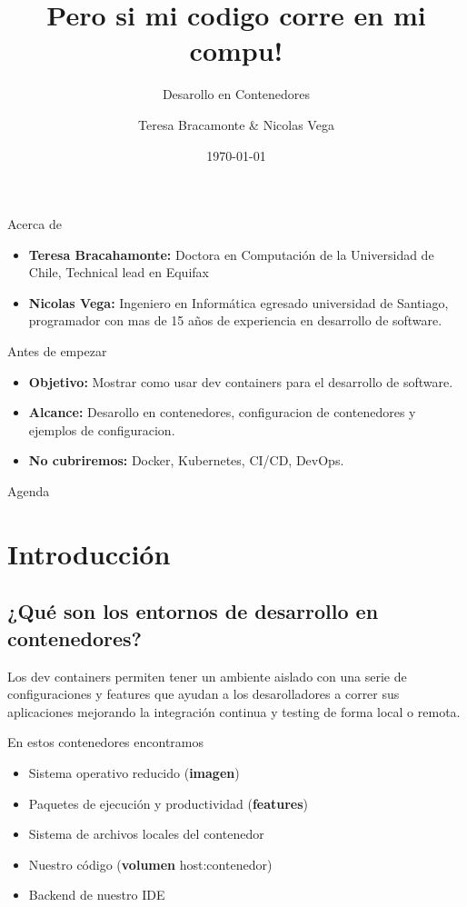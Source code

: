 \documentclass{beamer}
\title{Pero si mi codigo corre en mi compu!}
\subtitle{Desarollo en Contenedores}
\author{Teresa Bracamonte \& Nicolas Vega}
\date{\today}
\begin{document}
\begin{frame}
  \titlepage
\end{frame}

\begin{frame}{Acerca de}
  \begin{itemize}
    \item \textbf{Teresa Bracahamonte:} Doctora en Computación de la Universidad de Chile, Technical lead en Equifax
    \item \textbf{Nicolas Vega:} Ingeniero en Informática egresado universidad de Santiago, programador con mas de 15 años de experiencia en desarrollo de software.
  \end{itemize}
\end{frame}

\begin{frame}{Antes de empezar}
  \begin{itemize}
    \item \textbf{Objetivo:} Mostrar como usar dev containers para el desarrollo de software.
    \item \textbf{Alcance:} Desarollo en contenedores, configuracion de contenedores y ejemplos de configuracion.
    \item \textbf{No cubriremos:} Docker, Kubernetes, CI/CD, DevOps.
  \end{itemize} 
\end{frame}

\begin{frame}{Agenda}
  \tableofcontents
\end{frame}

\section{Introducción}
\subsection{¿Qué son los entornos de desarrollo en contenedores?}
\begin{frame}{\subsecname}
  Los dev containers permiten tener un ambiente aislado con una serie de configuraciones 
  y features que ayudan a los desarolladores a correr sus aplicaciones mejorando la 
  integración continua y testing de forma local o remota.

  \begin{block}{En estos contenedores encontramos}
    \begin{itemize}
      \item Sistema operativo reducido (\textbf{imagen})
      \item Paquetes de ejecución y productividad (\textbf{features})
      \item Sistema de archivos locales del contenedor
      \item Nuestro código (\textbf{volumen} host:contenedor)
      \item Backend de nuestro IDE
    \end{itemize}
  \end{block}
\end{frame}
\end{document}
